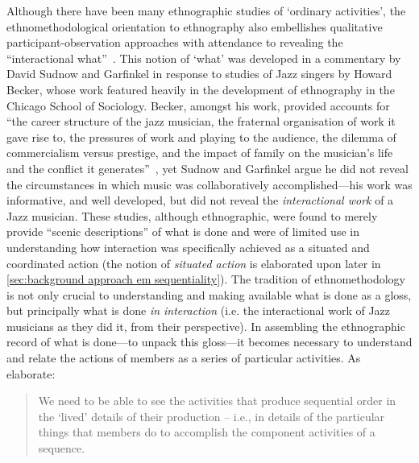 Although there have been many ethnographic studies of `ordinary activities', the ethnomethodological orientation to ethnography also embellishes qualitative participant-observation approaches with attendance to revealing the ``interactional what''~\citep{GarfinkelMissing}.
This notion of `what' was developed in a commentary by David Sudnow and Garfinkel in response to studies of Jazz singers by Howard Becker, whose work featured heavily in the development of ethnography in the Chicago School of Sociology.
Becker, amongst his work, provided accounts for ``the career structure of the jazz musician, the fraternal organisation of work it gave rise to, the pressures of work and playing to the audience, the dilemma of commercialism versus prestige, and the impact of family on the musician’s life and the conflict it generates''~\citep[pp. 116--117]{Button2015}, yet Sudnow and Garfinkel argue he did not reveal the circumstances in which music was collaboratively accomplished---his work was informative, and well developed, but did not reveal the \textit{interactional work} of a Jazz musician.
These studies, although ethnographic, were found to merely provide ``scenic descriptions'' of what is done and were of limited use in understanding how interaction was specifically achieved as a situated and coordinated action (the notion of \textit{situated action} is elaborated upon later in \ref{sec:background approach em sequentiality}).
The tradition of ethnomethodology is not only crucial to understanding and making available what is done as a gloss, but principally what is done \textit{in interaction} (i.e. the interactional work of Jazz musicians as they did it, from their perspective).
In assembling the ethnographic record of what is done---to unpack this gloss---it becomes necessary to understand and relate the actions of members as a series of particular activities.
As \citet{Crabtree2012} elaborate:
\begin{quote}
    We need to be able to see the activities that produce sequential order in the ‘lived’ details of their production -- i.e., in details of the particular things that members do to accomplish the component activities of a sequence.
\end{quote}



